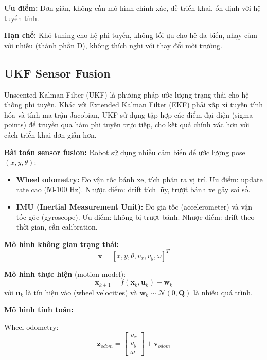 \textbf{Ưu điểm:} Đơn giản, không cần mô hình chính xác, dễ triển khai, ổn định với hệ tuyến tính.

\textbf{Hạn chế:} Khó tuning cho hệ phi tuyến, không tối ưu cho hệ đa biến, nhạy cảm với nhiễu (thành phần D), không thích nghi với thay đổi môi trường.

\subsection{UKF Sensor Fusion}
\label{subsec:ukf_sensor_fusion}

Unscented Kalman Filter (UKF) \cite{julier2004ukf} là phương pháp ước lượng trạng thái cho hệ thống phi tuyến. Khác với Extended Kalman Filter (EKF) phải xấp xỉ tuyến tính hóa và tính ma trận Jacobian, UKF sử dụng tập hợp các điểm đại diện (sigma points) để truyền qua hàm phi tuyến trực tiếp, cho kết quả chính xác hơn với cách triển khai đơn giản hơn.

\textbf{Bài toán sensor fusion:} Robot sử dụng nhiều cảm biến để ước lượng pose $(x, y, \theta)$:
\begin{itemize}
\item \textbf{Wheel odometry:} Đo vận tốc bánh xe, tích phân ra vị trí. Ưu điểm: update rate cao (50-100 Hz). Nhược điểm: drift tích lũy, trượt bánh xe gây sai số.
\item \textbf{IMU (Inertial Measurement Unit):} Đo gia tốc (accelerometer) và vận tốc góc (gyroscope). Ưu điểm: không bị trượt bánh. Nhược điểm: drift theo thời gian, cần calibration.
\end{itemize}

\textbf{Mô hình không gian trạng thái:}
\begin{equation}
\mathbf{x} = [x, y, \theta, v_x, v_y, \omega]^T
\end{equation}

\textbf{Mô hình thực hiện} (motion model):
\begin{equation}
\mathbf{x}_{k+1} = f(\mathbf{x}_k, \mathbf{u}_k) + \mathbf{w}_k
\end{equation}
với $\mathbf{u}_k$ là tín hiệu vào (wheel velocities) và $\mathbf{w}_k \sim \mathcal{N}(0, \mathbf{Q})$ là nhiễu quá trình.

\textbf{Mô hình tính toán:}

Wheel odometry:
\begin{equation}
\mathbf{z}_{odom} = \begin{bmatrix} v_x \\ v_y \\ \omega \end{bmatrix} + \mathbf{v}_{odom}
\end{equation}

